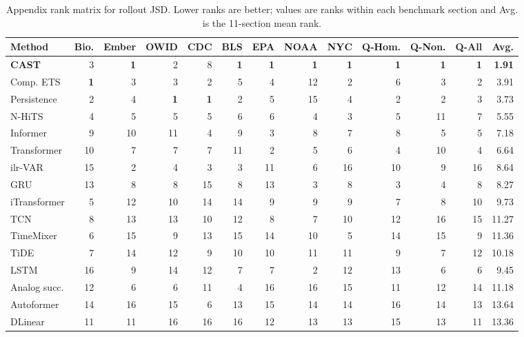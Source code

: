 \begin{table}[t]
\centering
\caption{Appendix rank matrix for rollout JSD. Lower ranks are better; values are ranks within each benchmark section and Avg. is the 11-section mean rank.}
\label{tab:appendix-rollout-jsd-rank-matrix}
\scriptsize
\setlength{\tabcolsep}{2.4pt}
\begin{tabular}{@{}lrrrrrrrrrrrr@{}}
\toprule
Method & Bio. & Ember & OWID & CDC & BLS & EPA & NOAA & NYC & Q-Hom. & Q-Non. & Q-All & Avg. \\
\midrule
\textbf{CAST} & 3 & \textbf{1} & 2 & 8 & \textbf{1} & \textbf{1} & \textbf{1} & \textbf{1} & \textbf{1} & \textbf{1} & \textbf{1} & \textbf{1.91} \\
Comp. ETS & \textbf{1} & 3 & 3 & 2 & 5 & 4 & 12 & 2 & 6 & 3 & 2 & 3.91 \\
Persistence & 2 & 4 & \textbf{1} & \textbf{1} & 2 & 5 & 15 & 4 & 2 & 2 & 3 & 3.73 \\
N-HiTS & 4 & 5 & 5 & 5 & 6 & 6 & 4 & 3 & 5 & 11 & 7 & 5.55 \\
Informer & 9 & 10 & 11 & 4 & 9 & 3 & 8 & 7 & 8 & 5 & 5 & 7.18 \\
Transformer & 10 & 7 & 7 & 7 & 11 & 2 & 5 & 6 & 4 & 10 & 4 & 6.64 \\
ilr-VAR & 15 & 2 & 4 & 3 & 3 & 11 & 6 & 16 & 10 & 9 & 16 & 8.64 \\
GRU & 13 & 8 & 8 & 15 & 8 & 13 & 3 & 8 & 3 & 4 & 8 & 8.27 \\
iTransformer & 5 & 12 & 10 & 14 & 14 & 9 & 9 & 9 & 7 & 8 & 10 & 9.73 \\
TCN & 8 & 13 & 13 & 10 & 12 & 8 & 7 & 10 & 12 & 16 & 15 & 11.27 \\
TimeMixer & 6 & 15 & 9 & 13 & 15 & 14 & 10 & 5 & 14 & 15 & 9 & 11.36 \\
TiDE & 7 & 14 & 12 & 9 & 10 & 10 & 11 & 11 & 9 & 7 & 12 & 10.18 \\
LSTM & 16 & 9 & 14 & 12 & 7 & 7 & 2 & 12 & 13 & 6 & 6 & 9.45 \\
Analog succ. & 12 & 6 & 6 & 11 & 4 & 16 & 16 & 15 & 11 & 12 & 14 & 11.18 \\
Autoformer & 14 & 16 & 15 & 6 & 13 & 15 & 14 & 14 & 16 & 14 & 13 & 13.64 \\
DLinear & 11 & 11 & 16 & 16 & 16 & 12 & 13 & 13 & 15 & 13 & 11 & 13.36 \\
\bottomrule
\end{tabular}
\end{table}

